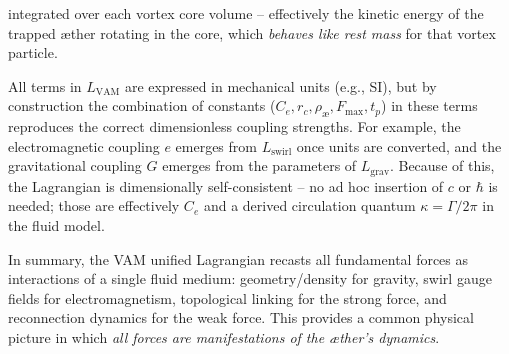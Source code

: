 integrated over each vortex core volume – effectively the kinetic energy of the trapped æther rotating in the core, which \textit{behaves like rest mass} for that vortex particle.

All terms in $L_{\text{VAM}}$ are expressed in mechanical units (e.g., SI), but by construction the combination of constants ($C_e, r_c, \rho_{\text{\ae}}, F_{\max}, t_p$) in these terms reproduces the correct dimensionless coupling strengths. For example, the electromagnetic coupling $e$ emerges from $L_{\text{swirl}}$ once units are converted, and the gravitational coupling $G$ emerges from the parameters of $L_{\text{grav}}$. Because of this, the Lagrangian is dimensionally self-consistent – no ad hoc insertion of $c$ or $\hbar$ is needed; those are effectively $C_e$ and a derived circulation quantum $\kappa = \Gamma/2\pi$ in the fluid model.

In summary, the VAM unified Lagrangian recasts all fundamental forces as interactions of a single fluid medium: geometry/density for gravity, swirl gauge fields for electromagnetism, topological linking for the strong force, and reconnection dynamics for the weak force. This provides a common physical picture in which \textit{all forces are manifestations of the æther's dynamics}.
